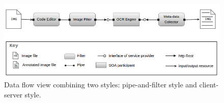 \begin{figure}[!htbp]
  \centering
  \includegraphics[width=.7\textwidth]{images/sc-tool-architecture}
    \caption{Data flow view combining two styles: pipe-and-filter style and client-server style.}
  \label{fig:sc-tool-arch}
\end{figure}